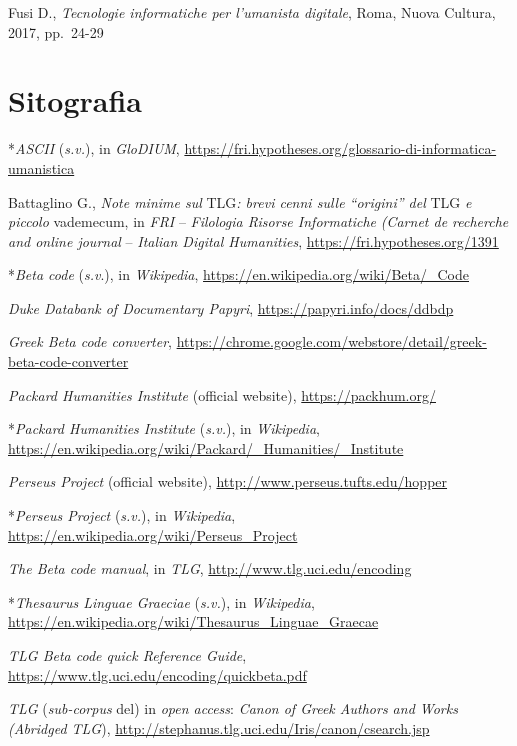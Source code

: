 \documentclass[
  b5paper,
  twoside,
  12pt,
  chapterprefix=false,
  bibliography=totocnumbered,
  parskip=false]{scrbook}
\begin{document}
Fusi D., \emph{Tecnologie informatiche per l'umanista digitale}, Roma, Nuova
Cultura, 2017, pp.~24-29

\hypertarget{sitografia-1}{%
\section*{Sitografia}\label{sitografia-1}}

*\emph{ASCII} (\emph{s.v.}), in \emph{GloDIUM},
\url{https://fri.hypotheses.org/glossario-di-informatica-umanistica}

Battaglino G., \emph{Note minime sul} TLG\emph{: brevi cenni sulle \enquote{origini} del}
TLG \emph{e piccolo} vademecum, in \emph{FRI} -- \emph{Filologia Risorse Informatiche}
\emph{(Carnet de recherche and online journal} -- \emph{Italian Digital
Humanities},
\url{https://fri.hypotheses.org/1391}

*\emph{Beta code} (\emph{s.v}.), in \emph{Wikipedia},
\url{https://en.wikipedia.org/wiki/Beta/_Code}

\emph{Duke Databank of Documentary Papyri},
\url{https://papyri.info/docs/ddbdp}

\emph{Greek Beta code converter},
\url{https://chrome.google.com/webstore/detail/greek-beta-code-converter}

\emph{Packard Humanities Institute} (official website),
\url{https://packhum.org/}

*\emph{Packard Humanities Institute} (\emph{s.v.}), in \emph{Wikipedia},
\url{https://en.wikipedia.org/wiki/Packard/_Humanities/_Institute}

\emph{Perseus Project} (official website),
\url{http://www.perseus.tufts.edu/hopper}

*\emph{Perseus Project} (\emph{s.v.}), in \emph{Wikipedia},
\url{https://en.wikipedia.org/wiki/Perseus_Project}

\emph{The Beta code manual}, in \emph{TLG},
\url{http://www.tlg.uci.edu/encoding}

*\emph{Thesaurus Linguae Graeciae} (\emph{s.v.}), in \emph{Wikipedia},
\url{https://en.wikipedia.org/wiki/Thesaurus_Linguae_Graecae}

\emph{TLG Beta code quick Reference Guide},
\url{https://www.tlg.uci.edu/encoding/quickbeta.pdf}

\emph{TLG} (\emph{sub-corpus} del) in \emph{open access}: \emph{Canon of Greek Authors and
Works (Abridged TLG}),
\url{http://stephanus.tlg.uci.edu/Iris/canon/csearch.jsp}
\end{document}

